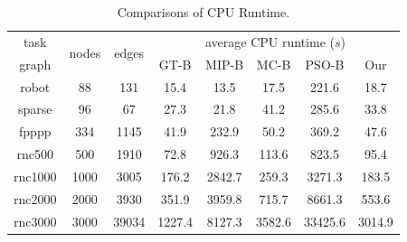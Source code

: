\documentclass[10pt,journal, compsoc]{IEEEtran}
\begin{document}
\begin{table}[!b]
\renewcommand{\arraystretch}{1.1}
\caption{Comparisons of CPU Runtime.}
\centering
\begin{tabular}{c|c|c|c|c|c|c|c}
\hline
\hline

~task~    &\multicolumn{1}{c|}{\multirow{2}{*}{\hspace{-0.5em}nodes\hspace{-0.5em}}}     &\multicolumn{1}{c|}{\multirow{2}{*}{\hspace{-0.5em}edges\hspace{-0.5em}}}     &\multicolumn{5}{c}{average CPU runtime ($s$)}   \\  \cline{4-8}
graph   &                                            &       &GT-B     &MIP-B &MC-B   &PSO-B  &Our          \\
\hline
\hline

robot   &88   &131     &15.4     &13.5  &17.5  &221.6  &18.7 \\

sparse  &96   &67    &27.3    &21.8 &41.2   &285.6  &33.8 \\

fpppp   &334   &1145     &41.9  &232.9  &50.2  &369.2  &47.6 \\

rnc500  &500   &1910      &72.8   &926.3   &113.6 &823.5  &95.4\\

\hspace{-0.5em}rnc1000\hspace{-0.5em}  &\hspace{-0.5em}1000\hspace{-0.5em}   &3005   &176.2    &2842.7    &259.3 &3271.3  &183.5\\

\hspace{-0.5em}rnc2000\hspace{-0.5em}   &\hspace{-0.5em}2000\hspace{-0.5em}   &3930    &351.9   &3959.8   &715.7  &8661.3  &553.6 \\

\hspace{-0.5em}rnc3000\hspace{-0.5em}   &\hspace{-0.5em}3000\hspace{-0.5em}   &\hspace{-0.5em}39034\hspace{-0.5em}     &\hspace{-0.5em}1227.4\hspace{-0.5em}    &8127.3  &\hspace{-0.5em}3582.6\hspace{-0.5em} &\hspace{-0.5em}33425.6\hspace{-0.5em}  &\hspace{-0.5em}3014.9\hspace{-0.5em}\\


\end{tabular}
\end{table}
\end{document}
